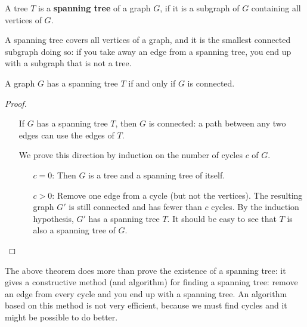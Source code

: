  \begin{definition}
A tree \textup{$T$ is a \textbf{spanning tree} of a graph $G$,
if it is a subgraph of $G$ containing all vertices of $G$.}
\end{definition}

A spanning tree covers all vertices of a graph, and it is the smallest
connected subgraph doing so: if you take away an edge from a spanning
tree, you end up with a subgraph that is not a tree.

 \begin{theorem}
A graph $G$ has a spanning tree $T$ if and only if $G$ is connected.
\end{theorem}
\begin{proof}~\\
\begin{itemize}
\item[\fbox{$\Rightarrow$}]
If $G$ has a spanning tree $T$, then $G$ is connected: a path between
any two edges can use the edges of $T$.

\item[\fbox{$\Leftarrow$}]
We prove this direction by induction on the number of cycles $c$ of $G$.
\begin{itemize}
\item[$c = 0$:]
Then $G$ is a tree and a spanning tree of itself.
\item[$c > 0$:]
Remove one edge from a cycle (but not the vertices). The resulting graph $G'$
is still connected and has fewer than $c$ cycles. By the induction hypothesis,
$G'$ has a spanning tree $T$. It should be easy to see that $T$ is also
a spanning tree of $G$.
\end{itemize}
\end{itemize}
\end{proof}

The above theorem does more than prove the existence of a spanning
tree: it gives a constructive method (and algorithm) for finding a
spanning tree: remove an edge from every cycle and you end up with a
spanning tree. An algorithm based on this method is not very
efficient, because we must find cycles and it might be possible to do
better.

